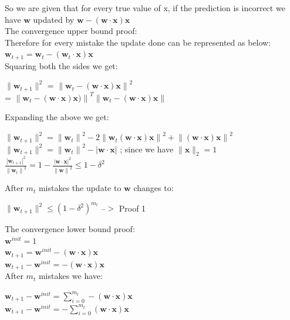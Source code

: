 \documentclass[a4paper]{article}
\theoremstyle{definition}
\renewcommand\vec[1]{\boldsymbol{#1}}
\newenvironment{soln}{
    \leavevmode\color{blue}\ignorespaces
}{}
\begin{document}
	\begin{soln} 
	So we are given that for every true value of x, if the prediction is incorrect we have $\vec w$ updated by $\vec w - (\vec w \cdot \vec x) \vec x$ \\
	The convergence upper bound proof: \\
	Therefore for every mistake the update done can be represented as below: $\vec w_{t+1} = \vec w_t - (\vec w_t \cdot \vec x)\vec x $ \\
	Squaring both the sides we get: \\
	\begin{center}
	 $\|\vec w_{t+1}\|^{2}$ = ${\|\vec w_{t} - (\vec w \cdot \vec x) \vec x\|}^{2}$ \\
	 = $ {\|\vec w_{t} - (\vec w \cdot \vec x) \vec x)\|}^{T}\|\vec w_{t} - (\vec w \cdot \vec x) \vec x\|$ \\
	\end{center}
	 Expanding the above we get: \\
	 \begin{center}
	  $\|\vec w_{t+1}\|^{2} =  {\|\vec w_{t}\|}^{2} - 2 {\|\vec w_{t}(\vec w \cdot \vec x) \vec x\|}^2 + {\|(\vec w \cdot \vec x) \vec x\|}^{2}$ \\
	  $\|\vec w_{t+1}\|^{2} = {\|\vec w_{t}\|}^{2} -  |{\vec w \cdot \vec x}|$ ; since we have  $\|\vec x\|_2 = 1$ \\
	 $\frac{|\vec w_{t+1}|^{2}}{{\|\vec w_t\|}^{2}} = 1 - \frac{|\vec w \cdot \vec x|^{2}}{{\|\vec w\|}^{2}} \leq 1 - \delta^2$ \\
	 \end{center}
	 After $m_t$ mistakes the update to $\vec w$ changes to: \\
	  \begin{center}
	 $\|\vec w_{t+1}\|^2 \leq {(1 - \delta^2)}^{m_t}$ --$>$ Proof 1 \\
	 \end{center}
	 The convergence lower bound proof: \\
	 $\vec w^{init} = 1$ \\
	 $\vec w_{t+1} = \vec w^{init} - (\vec w \cdot \vec x)\vec x$ \\
	 $\vec w_{t+1} - \vec w^{init} = - (\vec w \cdot \vec x)\vec x$ \\
	 After $m_t$ mistakes we have: \\
	  \begin{center}
	  $\vec w_{t+1} - \vec w^{init} =  \sum_{i = 0}^{m_t}- (\vec w \cdot  \vec x)\vec x$ \\
	  $\vec w_{t+1} - \vec w^{init} = - \sum_{i = 0}^{m_t} (\vec w \cdot \vec x)\vec x$ \\

\end{center}
\end{soln}
\end{document}
